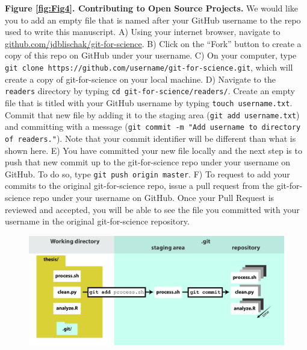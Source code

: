 \documentclass[10pt]{article}
\begin{document}
\textbf{Figure \ref{fig:Fig4}. Contributing to Open Source Projects.}
We would like you to add an empty file that is named after your GitHub username to the repo used to write this manuscript.
A) Using your internet browser, navigate to \href{https://github.com/jdblischak/git-for-science}{github.com/jdblischak/git-for-science}.
B) Click on the ``Fork'' button to create a copy of this repo on GitHub under your username.
C) On your computer, type \verb|git clone https://github.com/username/git-for-science.git|, which will create a copy of git-for-science on your local machine.
D) Navigate to the \verb|readers| directory by typing \verb|cd git-for-science/readers/|.
Create an empty file that is titled with your GitHub username by typing \verb|touch username.txt|.
Commit that new file by adding it to the staging area (\verb|git add username.txt|) and committing with a message (\verb|git commit -m "Add username to directory of readers."|).
Note that your commit identifier will be different than what is shown here.
E) You have committed your new file locally and the next step is to push that new commit up to the git-for-science repo under your username on GitHub.
To do so, type \verb|git push origin master|.
F) To request to add your commits to the original git-for-science repo, issue a pull request from the git-for-science repo under your username on GitHub.
Once your Pull Request is reviewed and accepted, you will be able to see the file you committed with your username in the original git-for-science repository.








\begin{figure}[h!]
\begin{center}
\includegraphics[width=1\columnwidth]{figures/Fig1/Fig1}
\caption{\textbf{\label{fig:Fig1}}%
}
\end{center}
\end{figure}
\end{document}
